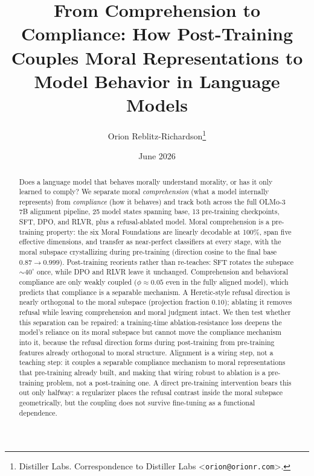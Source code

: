 \documentclass{article}
\title{From Comprehension to Compliance: How Post-Training Couples Moral
Representations to Model Behavior in Language Models}
\author{%
  Orion Reblitz-Richardson\thanks{%
    Distiller Labs. Correspondence to Distiller Labs
    \textless\texttt{orion@orionr.com}\textgreater.}
}
\date{June 2026}
\begin{document}
\maketitle

\begin{abstract}
Does a language model that behaves morally understand morality, or has it only
learned to comply? We separate moral \emph{comprehension} (what a model
internally represents) from \emph{compliance} (how it behaves) and track both
across the full OLMo-3 7B alignment pipeline, 25 model states spanning base,
13 pre-training checkpoints, SFT, DPO, and RLVR, plus a refusal-ablated model.
Moral comprehension is a pre-training property: the six Moral Foundations are
linearly decodable at 100\%, span five effective dimensions, and transfer as
near-perfect classifiers at every stage, with the moral subspace crystallizing
during pre-training (direction cosine to the final base $0.87 \to 0.999$).
Post-training reorients rather than re-teaches: SFT rotates the subspace
${\sim}40^{\circ}$ once, while DPO and RLVR leave it unchanged. Comprehension and
behavioral compliance are only weakly coupled ($\phi \approx 0.05$ even in the
fully aligned model), which predicts that compliance is a separable mechanism.
A Heretic-style refusal direction is nearly orthogonal to the moral subspace
(projection fraction $0.10$); ablating it removes refusal while leaving
comprehension and moral judgment intact. We then test whether this separation
can be repaired: a training-time ablation-resistance loss deepens the model's
reliance on its moral subspace but cannot move the compliance mechanism into it,
because the refusal direction forms during post-training from pre-training
features already orthogonal to moral structure. Alignment is a wiring step, not a
teaching step: it couples a separable compliance mechanism to moral
representations that pre-training already built, and making that wiring robust to
ablation is a pre-training problem, not a post-training one. A direct
pre-training intervention bears this out only halfway: a regularizer places the
refusal contrast inside the moral subspace geometrically, but the coupling does
not survive fine-tuning as a functional dependence.
\end{abstract}








\end{document}
